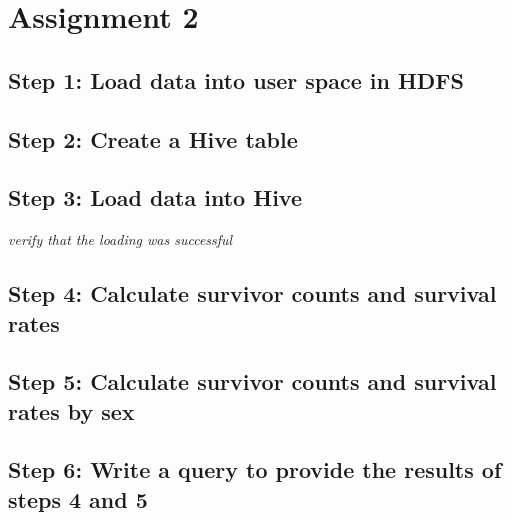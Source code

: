 \documentclass[]{article}
\begin{document}
\section*{Assignment 2}

\subsection*{Step 1: Load data into user space in HDFS} 
\subsection*{Step 2: Create a Hive table}
\subsection*{Step 3: Load data into Hive}
\emph{verify that the loading was successful}
\subsection*{Step 4: Calculate survivor counts and survival rates}
\subsection*{Step 5: Calculate survivor counts and survival rates by sex}
\subsection*{Step 6: Write a query to provide the results of steps 4 and 5}
\end{document}
